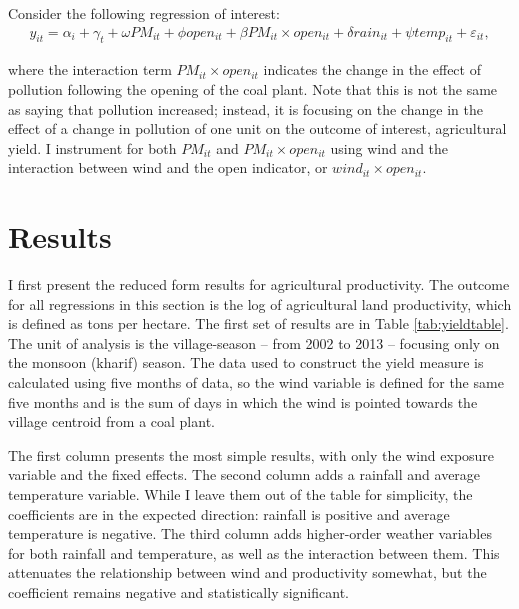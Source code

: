 \documentclass[
]{article}
\begin{document}
Consider the following regression of interest:
\begin{gather} 
y_{it} = \alpha_{i} + \gamma_{t} + \omega PM_{it} + \phi open_{it} + \beta PM_{it}\times open_{it} + \delta rain_{it} + \psi temp_{it} + \varepsilon_{it},
\end{gather}

where the interaction term \(PM_{it}\times open_{it}\) indicates the change in the effect of pollution following the opening of the coal plant. Note that this is not the same as saying that pollution increased; instead, it is focusing on the change in the effect of a change in pollution of one unit on the outcome of interest, agricultural yield. I instrument for both \(PM_{it}\) and \(PM_{it}\times open_{it}\) using wind and the interaction between wind and the open indicator, or \(wind_{it}\times open_{it}\).

\hypertarget{results}{%
\section{Results}\label{results}}

\label{results}

I first present the reduced form results for agricultural productivity. The outcome for all regressions in this section is the log of agricultural land productivity, which is defined as tons per hectare. The first set of results are in Table \ref{tab:yieldtable}. The unit of analysis is the village-season -- from 2002 to 2013 -- focusing only on the monsoon (kharif) season. The data used to construct the yield measure is calculated using five months of data, so the wind variable is defined for the same five months and is the sum of days in which the wind is pointed towards the village centroid from a coal plant.

The first column presents the most simple results, with only the wind exposure variable and the fixed effects. The second column adds a rainfall and average temperature variable. While I leave them out of the table for simplicity, the coefficients are in the expected direction: rainfall is positive and average temperature is negative. The third column adds higher-order weather variables for both rainfall and temperature, as well as the interaction between them. This attenuates the relationship between wind and productivity somewhat, but the coefficient remains negative and statistically significant.
\end{document}
